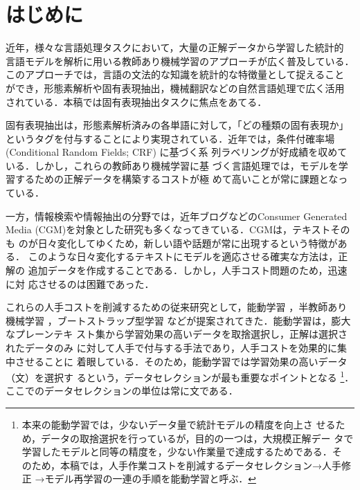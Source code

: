 \documentclass[japanese]{jnlp_1.4}
\begin{document}
\maketitle



\section{はじめに}

近年，様々な言語処理タスクにおいて，大量の正解データから学習した統計的
言語モデルを解析に用いる教師あり機械学習のアプローチが広く普及している．
このアプローチでは，言語の文法的な知識を統計的な特徴量として捉えること
ができ，形態素解析や固有表現抽出，機械翻訳などの自然言語処理で広く活用
されている．本稿では固有表現抽出タスクに焦点をあてる．

固有表現抽出は，形態素解析済みの各単語に対して，「どの種類の固有表現か」
というタグを付与することにより実現されている．近年では，条件付確率場
 (Conditional Random Fields; CRF) \cite{Lafferty:CRF2001,suzuki-mcdermott-isozaki:2006:COLACL}に基づく系
列ラベリングが好成績を収めている．しかし，これらの教師あり機械学習に基
づく言語処理では，モデルを学習するための正解データを構築するコストが極
めて高いことが常に課題となっている．

一方，情報検索や情報抽出の分野では，近年ブログなどのConsumer Generated
Media (CGM)を対象とした研究も多くなってきている．CGMは，テキストそのも
のが日々変化してゆくため，新しい語や話題が常に出現するという特徴がある．
このような日々変化するテキストにモデルを適応させる確実な方法は，正解の
追加データを作成することである．しかし，人手コスト問題のため，迅速に対
応させるのは困難であった．

これらの人手コストを削減するための従来研究として，能動学習
\cite{shen-EtAl:2004:ACL,laws-schutze:2008:PAPERS}，半教師あり機械学習
\cite{suzuki-isozaki:2008:ACLMain}，ブートストラップ型学習
\cite{Etzioni2005}などが提案されてきた．能動学習は，膨大なプレーンテキ
スト集から学習効果の高いデータを取捨選択し，正解は選択されたデータのみ
に対して人手で付与する手法であり，人手コストを効果的に集中させることに
着眼している．そのため，能動学習では学習効果の高いデータ（文）を選択す
るという，データセレクションが最も重要なポイントとなる
\footnote{本来の能動学習では，少ないデータ量で統計モデルの精度を向上さ
せるため，データの取捨選択を行っているが，目的の一つは，大規模正解デー
タで学習したモデルと同等の精度を，少ない作業量で達成するためである．そ
のため，本稿では，人手作業コストを削減するデータセレクション→人手修正
→モデル再学習の一連の手順を能動学習と呼ぶ．}．
ここでのデータセレクションの単位は常に文である．
\end{document}

